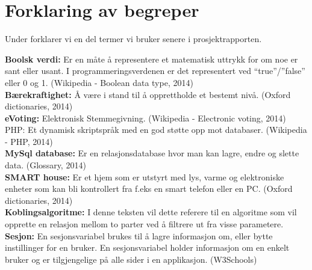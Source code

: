 \section{Forklaring av begreper}

Under forklarer vi en del termer vi bruker senere i prosjektrapporten.

{\bf Boolsk verdi:} Er en måte å representere et matematisk uttrykk for om noe er sant eller usant. I programmeringsverdenen er det representert ved “true”/”false” eller 0 og 1. (Wikipedia - Boolean data type, 2014)\\

{\bf Bærekraftighet:} Å være i stand til å opprettholde et bestemt nivå. (Oxford dictionaries, 2014)\\

{\bf eVoting:} Elektronisk Stemmegivning. (Wikipedia - Electronic voting, 2014)
PHP:  Et dynamisk skriptspråk med en god støtte opp mot databaser. (Wikipedia - PHP, 2014)\\

{\bf MySql database:} Er en relasjonsdatabase hvor man kan lagre, endre og slette data. (Glossary, 2014)\\

{\bf SMART house:} Er et hjem som er utstyrt med lys, varme og elektroniske enheter som kan bli kontrollert fra f.eks en smart telefon eller en PC. (Oxford dictionaries, 2014)\\

{\bf Koblingsalgoritme:}  I denne teksten vil dette referere til en algoritme som vil opprette en relasjon mellom to parter ved å filtrere ut fra visse parametere.\\

{\bf Sesjon:} En sesjonsvariabel brukes til å lagre informasjon om, eller bytte instillinger for en bruker. En sesjonsvariabel holder informasjon om en enkelt bruker og er tilgjengelige på alle sider i en applikasjon. (W3Schools)
